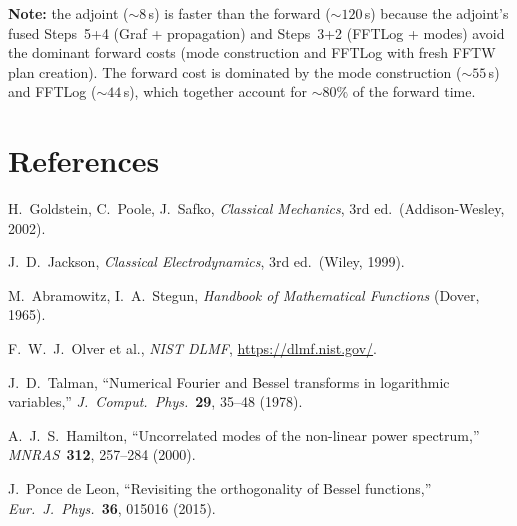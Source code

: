 \documentclass[11pt,a4paper]{article}
\begin{document}
\noindent
\textbf{Note:} the adjoint (${\sim}8$\,s) is faster than the forward (${\sim}120$\,s)
because the adjoint's fused Steps~5+4 (Graf + propagation) and Steps~3+2
(FFTLog + modes) avoid the dominant forward costs (mode construction and FFTLog
with fresh FFTW plan creation).  The forward cost is dominated by the mode
construction (${\sim}55$\,s) and FFTLog (${\sim}44$\,s), which together account
for ${\sim}80\%$ of the forward time.


\section*{References}

\begin{enumerate}[label={[\arabic*]},nosep]
\item H.~Goldstein, C.~Poole, J.~Safko, \emph{Classical Mechanics}, 3rd ed.\ (Addison-Wesley, 2002).
\item J.~D.~Jackson, \emph{Classical Electrodynamics}, 3rd ed.\ (Wiley, 1999).
\item M.~Abramowitz, I.~A.~Stegun, \emph{Handbook of Mathematical Functions} (Dover, 1965).
\item F.~W.~J.~Olver et al., \emph{NIST DLMF}, \url{https://dlmf.nist.gov/}.
\item J.~D.~Talman, ``Numerical Fourier and Bessel transforms in logarithmic variables,''
      \emph{J.\ Comput.\ Phys.}\ \textbf{29}, 35--48 (1978).
\item A.~J.~S.~Hamilton, ``Uncorrelated modes of the non-linear power spectrum,''
      \emph{MNRAS}\ \textbf{312}, 257--284 (2000).
\item J.~Ponce de Leon, ``Revisiting the orthogonality of Bessel functions,''
      \emph{Eur.\ J.\ Phys.}\ \textbf{36}, 015016 (2015).
\end{enumerate}
\end{document}
